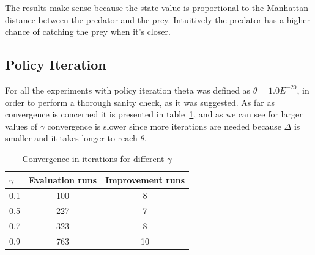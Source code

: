 \documentclass[paper=a4, fontsize=11pt]{scrartcl}
\numberwithin{equation}{section}		%
\numberwithin{figure}{section}			%
\numberwithin{table}{section}				%
\begin{document}
The results make sense because the state value is proportional to the Manhattan distance between the predator and the prey. Intuitively the predator has a higher chance of catching the prey when it's closer.



\subsection{Policy Iteration}
For all the experiments with policy iteration theta was defined as $\theta = 1.0E^{-20}$, in order to perform a thorough sanity check, as it was suggested. As far as convergence is concerned it is presented in table~\ref{convPIter}, and as we can see for larger values of $\gamma$ convergence is slower since more iterations are needed because $\Delta$ is smaller and it takes longer to reach $\theta$.

\begin{table}[H]
\caption{Convergence in iterations for different $\gamma$}
\centering
\begin{tabular}{|l||c|c|}
\hline
$\gamma$&Evaluation runs&Improvement runs\\
\hline
0.1&100&8\\
\hline
0.5&227&7\\
\hline
0.7&323&8\\
\hline
0.9&763&10\\
\hline
\end{tabular}
\label{convPIter}
\end{table}
\end{document}
